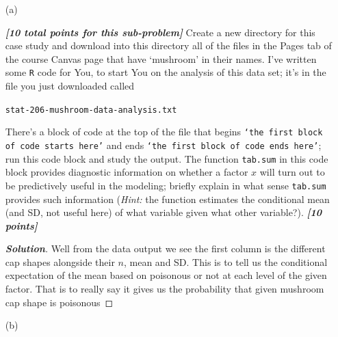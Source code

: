 \documentclass[12pt]{article}
\newenvironment{solution}{\begin{tcolorbox}[breakable]\begin{proof}[\textbf{\textit{Solution}}] }{\end{proof}\end{tcolorbox}}
\newcommand{\bi}[1]{\textbf{\textit{#1}}}
\begin{document}
\begin{itemize}

\item[(a)]

\bi{[10 total points for this sub-problem]} Create a new directory for this case study and download into this directory all of the files in the Pages tab of the course Canvas page that have `mushroom' in their names. I've written some \texttt{R} code for You, to start You on the analysis of this data set; it's in the file you just downloaded called

\hspace*{1.0in} \texttt{stat-206-mushroom-data-analysis.txt}

There's a block of code at the top of the file that begins \texttt{`the first block of code starts here'} and ends \texttt{`the first block of code ends here'}; run this code block and study the output. The function \texttt{tab.sum} in this code block provides diagnostic information on whether a factor $x$ will turn out to be predictively useful in the modeling; briefly explain in what sense \texttt{tab.sum} provides such information (\textit{Hint:} the function estimates the conditional mean (and SD, not useful here) of what variable given what other variable?). \bi{[10 points]}

\begin{solution}
    Well from the data output we see the first column is the different cap shapes alongside their $n$, mean and SD. This is to tell us the conditional expectation of the mean based on poisonous or not at each level of the given factor. That is to really say it gives us the probability that given mushroom cap shape is poisonous
\end{solution}

\item[(b)]


\end{itemize}
\end{document}
